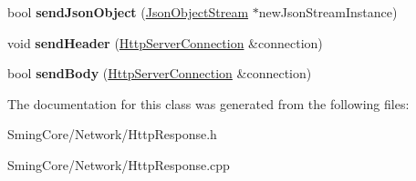 \begin{DoxyCompactItemize}
\item 
\hypertarget{class_http_response_a4ad42c6da411ab80d938f1f07e77171d}{}bool {\bfseries send\+Json\+Object} (\hyperlink{class_json_object_stream}{Json\+Object\+Stream} $\ast$new\+Json\+Stream\+Instance)\label{class_http_response_a4ad42c6da411ab80d938f1f07e77171d}

\item 
\hypertarget{class_http_response_a522560820fec07c4f1f8675699d85887}{}void {\bfseries send\+Header} (\hyperlink{class_http_server_connection}{Http\+Server\+Connection} \&connection)\label{class_http_response_a522560820fec07c4f1f8675699d85887}

\item 
\hypertarget{class_http_response_a57b20ddbf914fb287f4c321b93a872fe}{}bool {\bfseries send\+Body} (\hyperlink{class_http_server_connection}{Http\+Server\+Connection} \&connection)\label{class_http_response_a57b20ddbf914fb287f4c321b93a872fe}

\end{DoxyCompactItemize}


The documentation for this class was generated from the following files\+:\begin{DoxyCompactItemize}
\item 
Sming\+Core/\+Network/Http\+Response.\+h\item 
Sming\+Core/\+Network/Http\+Response.\+cpp\end{DoxyCompactItemize}
